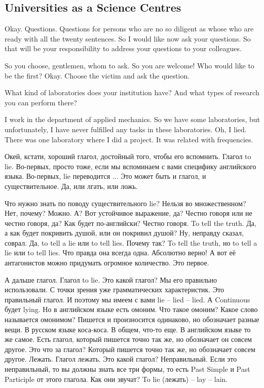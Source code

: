 \documentclass[main.tex]{subfiles}
\begin{document}
\subsection{Universities as a Science Centres}

Okay.
Questions.
Questions for persons who are no so diligent as whose who are ready with all the twenty sentences.
So I would like now ask your questions.
So that will be your responsibility to address your questions to your colleagues.

So you choose, gentlemen, whom to ask.
So you are welcome!
Who would like to be the first?
Okay.
Choose the victim and ask the question.

What kind of laboratories does your institution have?
And what types of research you can perform there?

I work in the department of applied mechanics.
So we have some laboratories, but unfortunately, I have never fulfilled any tasks in these laboratories.
Oh, I lied.
There was one laboratory where I did a project.
It was related with frequencies.

Окей, кстати, хороший глагол, достойный того, чтобы его вспомнить.
Глагол to lie.
Во-первых, просто тоже, если мы вспоминаем с вами специфику английского языка.
Во-первых, lie переводится ...
Это может быть и глагол, и существительное.
Да, или лгать, или ложь.

Что нужно знать по поводу существительного lie?
Нельзя во множественном?
Нет, почему?
Можно.
А? Вот устойчивое выражение, да? Честно говоря или не честно говоря, да?
Как будет по-английски?
Честно говоря.
To tell the truth.
Да, а как будет покривить душой, или он покривил душой?
Ну, неправду сказал, соврал.
Да, to tell a lie или to tell lies.
Почему так?
To tell the truth, но to tell a lie или to tell lies.
Что правда она всегда одна.
Абсолютно верно!
А вот её антагонистов можно придумать огромное количество.
Это первое.

А дальше глагол.
Глагол to lie.
Это какой глагол?
Мы его правильно использовали.
С точки зрения уже грамматических характеристик.
Это правильный глагол.
И поэтому мы имеем с вами lie -- lied -- lied.
А Continuous будет lying.
Но в английском языке есть омоним.
Что такое омоним?
Какое слово называется омонимом?
Пишется и произносится одинаково, но обозначает разные вещи.
В русском языке коса-коса.
В общем, что-то еще.
В английском языке то же самое.
Есть глагол, который пишется точно так же, но обозначает он совсем другое.
Это что за глагол?
Который пишется точно так же, но обозначает совсем другое.
Лежать.
Глагол лежать.
Это какой глагол?
Неправильный.
Если это неправильный, то вы должны знать все три формы, то есть Past Simple и Past Participle от этого глагола.
Как они звучат?
To lie (лежать) -- lay -- lain.
\end{document}

